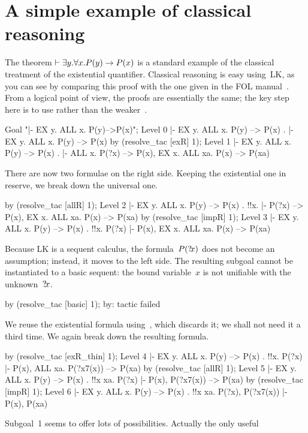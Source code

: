 \section{A simple example of classical reasoning} 
The theorem $\vdash\exists y.\forall x.P(y)\rightarrow P(x)$ is a standard example of the
classical treatment of the existential quantifier.  Classical reasoning is
easy using~LK, as you can see by comparing this proof with the one given in
the FOL manual~\cite{isabelle-ZF}.  From a logical point of view, the proofs
are essentially the same; the key step here is to use  rather than
the weaker~.
\begin{ttbox}
Goal "|- EX y. ALL x. P(y)-->P(x)";
{\out Level 0}
{\out  |- EX y. ALL x. P(y) --> P(x)}
{.  |- EX y. ALL x. P(y) --> P(x)}
by (resolve_tac [exR] 1);
{\out Level 1}
{\out  |- EX y. ALL x. P(y) --> P(x)}
{.  |- ALL x. P(?x) --> P(x), EX x. ALL xa. P(x) --> P(xa)}
\end{ttbox}
There are now two formulae on the right side.  Keeping the existential one
in reserve, we break down the universal one.
\begin{ttbox}
by (resolve_tac [allR] 1);
{\out Level 2}
{\out  |- EX y. ALL x. P(y) --> P(x)}
{. !!x.  |- P(?x) --> P(x), EX x. ALL xa. P(x) --> P(xa)}
by (resolve_tac [impR] 1);
{\out Level 3}
{\out  |- EX y. ALL x. P(y) --> P(x)}
{. !!x. P(?x) |- P(x), EX x. ALL xa. P(x) --> P(xa)}
\end{ttbox}
Because LK is a sequent calculus, the formula~$P({?\!x})$ does not become an
assumption; instead, it moves to the left side.  The resulting subgoal cannot
be instantiated to a basic sequent: the bound variable~$x$ is not unifiable
with the unknown~${?\!x}$.
\begin{ttbox}
by (resolve_tac [basic] 1);
{\out by: tactic failed}
\end{ttbox}
We reuse the existential formula using~, which discards
it; we shall not need it a third time.  We again break down the resulting
formula.
\begin{ttbox}
by (resolve_tac [exR_thin] 1);
{\out Level 4}
{\out  |- EX y. ALL x. P(y) --> P(x)}
{. !!x. P(?x) |- P(x), ALL xa. P(?x7(x)) --> P(xa)}
by (resolve_tac [allR] 1);
{\out Level 5}
{\out  |- EX y. ALL x. P(y) --> P(x)}
{. !!x xa. P(?x) |- P(x), P(?x7(x)) --> P(xa)}
by (resolve_tac [impR] 1);
{\out Level 6}
{\out  |- EX y. ALL x. P(y) --> P(x)}
{. !!x xa. P(?x), P(?x7(x)) |- P(x), P(xa)}
\end{ttbox}
Subgoal~1 seems to offer lots of possibilities.  Actually the only useful
